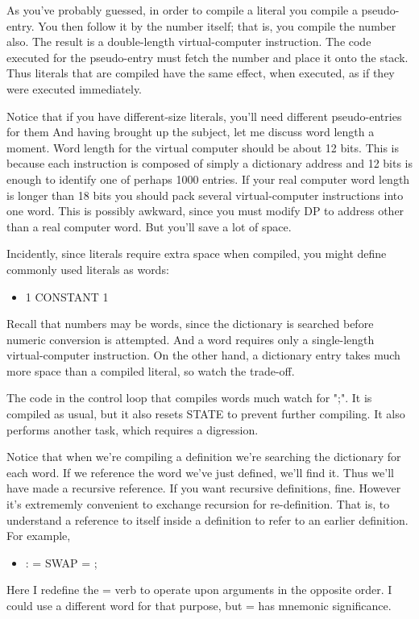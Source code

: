 \documentclass[b5paper, oneside]{book}
\begin{document}
As you've probably guessed, in order to compile a literal you compile a pseudo-entry. You then follow it by the number itself; that is, you compile the number also. The result is a double-length virtual-computer instruction. The code executed for the pseudo-entry must fetch the number and place it onto the stack. Thus literals that are compiled have the same effect, when executed, as if they were executed immediately.

Notice that if you have different-size literals, you'll need different pseudo-entries for them And having brought up the subject, let me discuss word length a moment. Word length for the virtual computer should be about 12 bits. This is because each instruction is composed of simply a dictionary address and 12 bits is enough to identify one of perhaps 1000 entries. If your real computer word length is longer than 18 bits you should pack several virtual-computer instructions into one word. This is possibly awkward, since you must modify DP to address other than a real computer word. But you'll save a lot of space.

Incidently, since literals require extra space when compiled, you might define commonly used literals as words:\begin{itemize}
   \item 1 CONSTANT 1\end{itemize}
Recall that numbers may be words, since the dictionary is searched before numeric conversion is attempted. And a word requires only a single-length virtual-computer instruction. On the other hand, a dictionary entry takes much more space than a compiled literal, so watch the trade-off.

The code in the control loop that compiles words much watch for ";". It is compiled as usual, but it also resets STATE to prevent further compiling. It also performs another task, which requires a digression.

Notice that when we're compiling a definition we're searching the dictionary for each word. If we reference the word we've just defined, we'll find it. Thus we'll have made a recursive reference. If you want recursive definitions, fine. However it's extrememly convenient to exchange recursion for re-definition. That is, to understand a reference to itself inside a definition to refer to an earlier definition. For example,\begin{itemize}
   \item : = SWAP = ;\end{itemize}
Here I redefine the = verb to operate upon arguments in the opposite order. I could use a different word for that purpose, but = has mnemonic significance.
\end{document}
